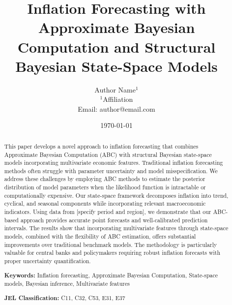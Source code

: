 \documentclass[12pt]{article}
\title{Inflation Forecasting with Approximate Bayesian Computation and Structural Bayesian State-Space Models}
\author{
    Author Name$^{1}$ \\
    \small $^{1}$Affiliation \\
    \small Email: author@email.com
}
\date{\today}
\begin{document}
\maketitle

\begin{abstract}
This paper develops a novel approach to inflation forecasting that combines Approximate Bayesian Computation (ABC) with structural Bayesian state-space models incorporating multivariate economic features. Traditional inflation forecasting methods often struggle with parameter uncertainty and model misspecification. We address these challenges by employing ABC methods to estimate the posterior distribution of model parameters when the likelihood function is intractable or computationally expensive. Our state-space framework decomposes inflation into trend, cyclical, and seasonal components while incorporating relevant macroeconomic indicators. Using data from [specify period and region], we demonstrate that our ABC-based approach provides accurate point forecasts and well-calibrated prediction intervals. The results show that incorporating multivariate features through state-space models, combined with the flexibility of ABC estimation, offers substantial improvements over traditional benchmark models. The methodology is particularly valuable for central banks and policymakers requiring robust inflation forecasts with proper uncertainty quantification.

\noindent \textbf{Keywords:} Inflation forecasting, Approximate Bayesian Computation, State-space models, Bayesian inference, Multivariate features

\noindent \textbf{JEL Classification:} C11, C32, C53, E31, E37
\end{abstract}

\newpage

\tableofcontents

\newpage











\appendix


\end{document}
